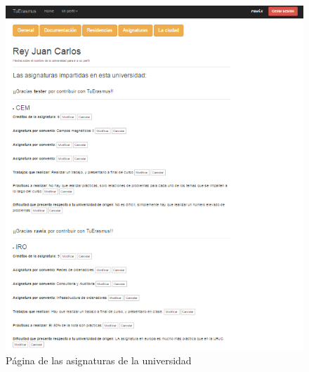 \begin{figure}[htbp]
	
	\centering
	\includegraphics[scale=0.5]{./Figuras/tuerasmusPages/privatePages/uniAsignaturas.png}
	\caption{P\'agina de las asignaturas de la universidad}
	\label{fig:uniA}
	
\end{figure}
